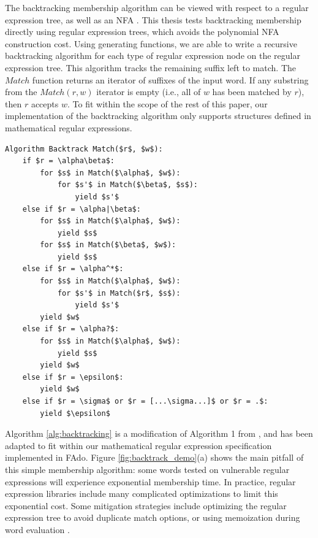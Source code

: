 The backtracking membership algorithm can be viewed with respect to a regular expression tree, as well as an NFA \cite{cata-backtrack}. This thesis tests backtracking membership directly using regular expression trees, which avoids the polynomial NFA construction cost. Using generating functions, we are able to write a recursive backtracking algorithm for each type of regular expression node on the regular expression tree. This algorithm tracks the remaining suffix left to match. The $Match$ function returns an iterator of suffixes of the input word. If any substring from the $Match(r, w)$ iterator is empty (i.e., all of $w$ has been matched by $r$), then $r$ accepts $w$. To fit within the scope of the rest of this paper, our implementation of the backtracking algorithm  only supports structures defined in mathematical regular expressions.

\begin{lstlisting}[label={alg:backtracking}, caption={Deciding membership using backtracking}]
Algorithm Backtrack Match($r$, $w$):
    if $r = \alpha\beta$:
        for $s$ in Match($\alpha$, $w$):
            for $s'$ in Match($\beta$, $s$):
                yield $s'$
    else if $r = \alpha|\beta$:
        for $s$ in Match($\alpha$, $w$):
            yield $s$
        for $s$ in Match($\beta$, $w$):
            yield $s$
    else if $r = \alpha^*$:
        for $s$ in Match($\alpha$, $w$):
            for $s'$ in Match($r$, $s$):
                yield $s'$
        yield $w$
    else if $r = \alpha?$:
        for $s$ in Match($\alpha$, $w$):
            yield $s$
        yield $w$
    else if $r = \epsilon$:
        yield $w$
    else if $r = \sigma$ or $r = [...\sigma...]$ or $r = .$:
        yield $\epsilon$
\end{lstlisting}

Algorithm \ref{alg:backtracking} is a modification of Algorithm 1 from \cite{cata-backtrack}, and has been adapted to fit within our mathematical regular expression specification implemented in FAdo. Figure \ref{fig:backtrack_demo}(a) shows the main pitfall of this simple membership algorithm: some words tested on vulnerable regular expressions will experience exponential membership time. In practice, regular expression libraries include many complicated optimizations to limit this exponential cost. Some mitigation strategies include optimizing the regular expression tree to avoid duplicate match options, or using memoization during word evaluation \cite{cata-backtrack, cox}.

